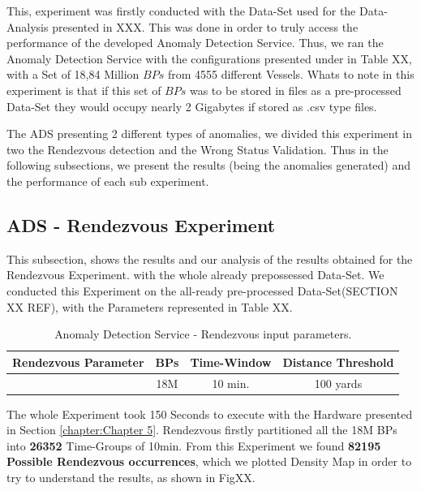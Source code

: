 This, experiment was firstly conducted with the Data-Set used for the Data-Analysis presented in XXX. This was done in order to truly access the performance of the developed Anomaly Detection Service. Thus, we ran the Anomaly Detection Service with the configurations presented under in Table XX, with a Set of 18,84 Million  $BPs$ from 4555 different Vessels. 
Whats to note in this experiment is that if this set of $BPs$ was to be stored in files as a pre-processed Data-Set they would occupy nearly 2 Gigabytes if stored as .csv type files.

The ADS presenting 2 different types of anomalies, we divided this experiment in two the Rendezvous detection and the Wrong Status Validation. Thus in the following subsections, we present the results (being the anomalies generated) and the performance of each sub experiment.


\subsection{ADS - Rendezvous Experiment}
\label{subsection: ADS - Rendezvous Experiment}
This subsection, shows the results and our analysis of the results obtained for the Rendezvous Experiment. with the whole already prepossessed Data-Set.
We conducted this Experiment on the all-ready pre-processed Data-Set(SECTION XX REF), with the Parameters represented in Table XX.

\begin{table}[H]
\centering
\caption{Anomaly Detection Service - Rendezvous input parameters.}
\label{Table: 5 ADS Rendezvous input paramenters.}
\begin{tabular}{@{}cccc@{}}
\toprule
Rendezvous Parameter & BPs & Time-Window & Distance Threshold \\ \midrule
                    & 18M & 10 min.     & 100 yards         \\ \bottomrule
\end{tabular}
\end{table}

The whole Experiment took 150 Seconds to execute with the Hardware presented in Section \ref{chapter:Chapter 5}. Rendezvous firstly partitioned all the 18M BPs into \textbf{26352} Time-Groups of 10min. From this Experiment we found \textbf{82195 Possible Rendezvous occurrences}, which we plotted Density Map in order to try to understand the results, as shown in FigXX.


